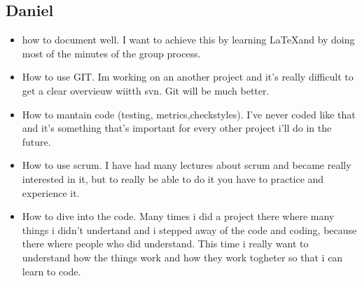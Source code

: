 \documentclass{article}
\begin{document}
\subsection*{Daniel} 
\begin{itemize}
	\item how to document well. I want to achieve this by learning \LaTeX  and by doing most of the  minutes of the group process. 
	\item How to use GIT. Im working on an another project and it's really difficult to get a clear overvieuw wiitth svn. Git will be much better. 
	\item How to mantain code (testing, metrics,checkstyles). I've never coded like that and it's something that's important for every other project i'll do in the future. 
	\item How to use scrum. I have had many lectures about scrum and became really interested in it, but to really be able to do it you have to practice and experience it. 
	\item How to dive into the code. Many times i did a project there where many things i didn't undertand and i stepped away of the code and coding, because there where people who did understand. This time i really want to understand how the things work and how they work togheter so that i can learn to code.  
\end{itemize}
\end{document}

